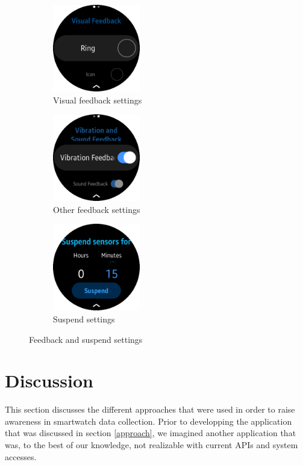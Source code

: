 \documentclass[conference, a4paper, 10pt, twocolumn]{IEEEtran}
\begin{document}
\begin{figure}[t!]
    \centering
    \begin{subfigure}[t]{0.32\textwidth}
        \centering
        \includegraphics[height=1.5in]{img/settingsVisualFeedback.png}
        \caption{Visual feedback settings}
    \end{subfigure}%
    \begin{subfigure}[t]{0.32\textwidth}
        \centering
        \includegraphics[height=1.5in]{img/settingsOtherFeedback.png}
        \caption{Other feedback settings}
    \end{subfigure}
    \begin{subfigure}[t]{0.32\textwidth}
        \centering
        \includegraphics[height=1.5in]{img/settingsSuspend.png}
        \caption{Suspend settings}
    \end{subfigure}
    \caption{Feedback and suspend settings}
    \label{feedbackSettingsImage}
\end{figure}


\section{Discussion}\label{discussion}
This section discusses the different approaches that were used in order to raise awareness in smartwatch data collection. Prior to developping the application that was discussed in section \ref{approach}, we imagined another application that was, to the best of our knowledge, not realizable with current \acp{API} and system accesses.  
\end{document}
